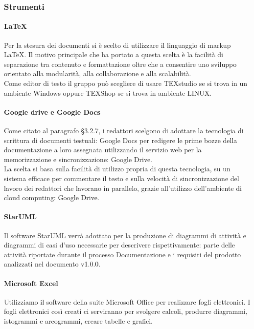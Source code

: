         \subsubsection{Strumenti}
            \paragraph{LaTeX}
                Per la stesura dei documenti si è scelto di utilizzare il linguaggio di markup LaTeX. Il motivo principale che ha portato a questa scelta è la facilità di separazione tra contenuto e formattazione oltre che a consentire uno sviluppo orientato alla modularità, alla collaborazione e alla scalabilità.\\
                Come editor di testo il gruppo può scegliere di usare TEXstudio se si trova in un ambiente Windows oppure TEXShop se si trova in ambiente LINUX.  \\
            \paragraph{Google drive e Google Docs}
                Come citato al paragrafo §3.2.7, i redattori scelgono di adottare la tecnologia di scrittura di documenti testuali: Google Docs per redigere le prime bozze della documentazione a loro assegnata utilizzando il servizio web per la memorizzazione e sincronizzazione: Google Drive. \\
                La scelta si basa sulla facilità di utilizzo propria di questa tecnologia, su un sistema efficace per commentare il testo e sulla velocità di sincronizzazione del lavoro dei redattori che lavorano in parallelo, grazie all’utilizzo dell’ambiente di cloud computing: Google Drive. \\
            \paragraph{StarUML}
                Il software StarUML verrà adottato per la produzione di diagrammi di attività e diagrammi di casi d’uso necessarie per descrivere rispettivamente: parte delle attività riportate durante il processo Documentazione e i requisiti del prodotto analizzati nel documento  v1.0.0.
            \paragraph{Microsoft Excel}
                Utilizziamo il software della suite Microsoft Office per realizzare fogli elettronici. I fogli elettronici così creati ci serviranno per svolgere calcoli, produrre diagrammi, istogrammi e areogrammi, creare tabelle e grafici.
